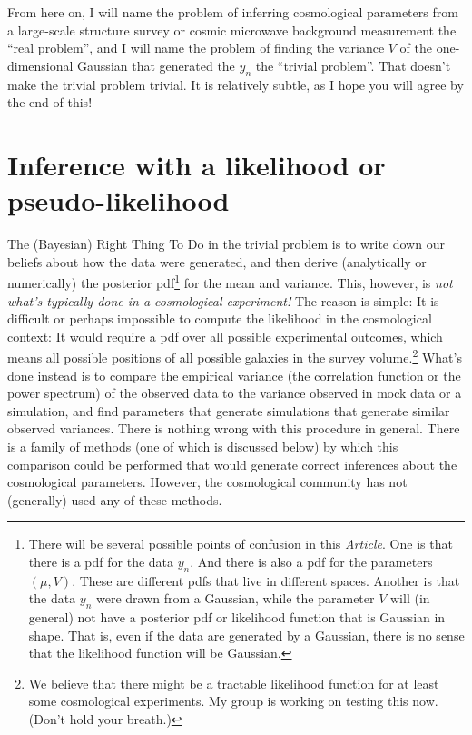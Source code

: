 \documentclass[12pt, letterpaper, preprint]{aastex}
\newcommand{\documentname}{\textsl{Article}}
\begin{document}
From here on, I will name the problem of inferring cosmological
parameters from a large-scale structure survey or cosmic microwave
background measurement the ``real problem'', and I will name the
problem of finding the variance $V$ of the one-dimensional Gaussian
that generated the $y_n$ the ``trivial problem''.
That doesn't make the trivial problem trivial.
It is relatively subtle, as I hope you will agree by the end of this!

\section{Inference with a likelihood or pseudo-likelihood}

The (Bayesian) Right Thing To Do in the trivial problem is to write
down our beliefs about how the data were generated, and then derive
(analytically or numerically) the posterior pdf\footnote{There will be
  several possible points of confusion in this \documentname. One is
  that there is a pdf for the data $y_n$. And there is also a pdf for
  the parameters $(\mu,V)$. These are different pdfs that live in
  different spaces. Another is that the data $y_n$ were drawn from a
  Gaussian, while the parameter $V$ will (in general) not have a
  posterior pdf or likelihood function that is Gaussian in shape. That
  is, even if the data are generated by a Gaussian, there is no sense
  that the likelihood function will be Gaussian.} for the mean and
variance.
This, however, is \emph{not what's typically done in a cosmological
experiment!}
The reason is simple: It is difficult or perhaps impossible to compute
the likelihood in the cosmological context: It would require a pdf
over all possible experimental outcomes, which means all possible
positions of all possible galaxies in the survey volume.\footnote{We
  believe that there might be a tractable likelihood function for at
  least some cosmological experiments. My group is working on testing this
  now. (Don't hold your breath.)}
What's done instead is to compare the empirical variance (the
correlation function or the power spectrum) of the observed data to
the variance observed in mock data or a simulation, and find
parameters that generate simulations that generate similar observed
variances.
There is nothing wrong with this procedure in general.  There is a
family of methods (one of which is discussed below) by which this comparison could be performed
that would generate correct inferences about the cosmological
parameters.
However, the cosmological community has not (generally) used any of
these methods.
\end{document}
